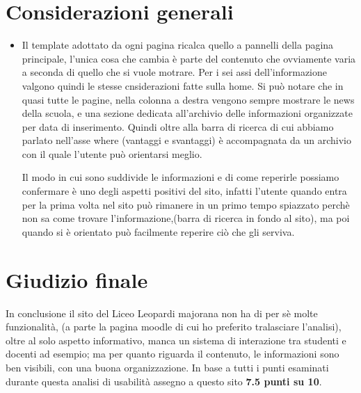 \documentclass[12pt]{article}
\begin{document}
\section{Considerazioni generali}
\begin{itemize}
	\item Il template adottato da ogni pagina ricalca quello a pannelli della pagina principale, l'unica cosa che cambia \`e parte del contenuto che ovviamente varia a seconda di quello che si vuole motrare. Per i sei assi dell'informazione valgono quindi le stesse cnsiderazioni fatte sulla home.
	Si pu\`o notare che in quasi tutte le pagine,  nella colonna a destra vengono sempre mostrare le news della scuola, e una sezione dedicata all'archivio delle informazioni organizzate per data di inserimento.
	Quindi oltre alla barra di ricerca di cui abbiamo parlato nell'asse where (vantaggi e svantaggi) \`e accompagnata da un archivio con il quale l'utente pu\`o orientarsi meglio.

	Il modo in cui sono suddivide le informazioni e di come reperirle possiamo confermare \`e uno degli aspetti positivi del sito, infatti l'utente quando entra per la prima volta nel sito pu\`o rimanere in un primo tempo spiazzato perch\`e non sa come trovare l'informazione,(barra di ricerca in fondo al sito), ma poi quando si \`e orientato
	pu\`o facilmente reperire ci\`o che gli serviva.

\end{itemize}

\section{Giudizio finale}
In conclusione il sito del Liceo Leopardi majorana non ha di per s\`e molte funzionalit\`a, (a parte la pagina moodle di cui ho preferito tralasciare l'analisi), oltre al solo aspetto informativo, manca un sistema di interazione tra studenti e docenti ad esempio; ma per quanto riguarda il contenuto, le informazioni sono ben visibili, con una buona organizzazione. In base a tutti i punti esaminati durante questa analisi di usabilit\`a assegno a questo sito \textbf{7.5 punti su 10}.
\end{document}
